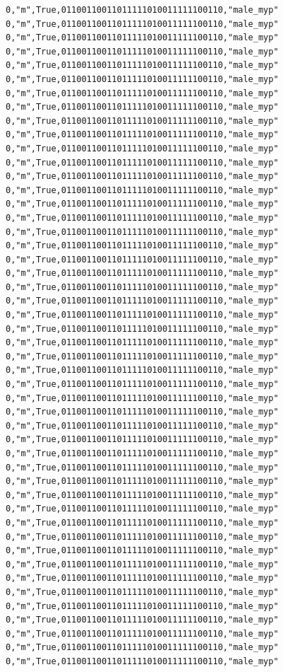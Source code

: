 \documentclass[authoryearcitations]{UoYCSproject}
\begin{document}
\begin{framed}
\begin{verbatim}
0,"m",True,01100110011011111010011111100110,"male_myp"
0,"m",True,01100110011011111010011111100110,"male_myp"
0,"m",True,01100110011011111010011111100110,"male_myp"
0,"m",True,01100110011011111010011111100110,"male_myp"
0,"m",True,01100110011011111010011111100110,"male_myp"
0,"m",True,01100110011011111010011111100110,"male_myp"
0,"m",True,01100110011011111010011111100110,"male_myp"
0,"m",True,01100110011011111010011111100110,"male_myp"
0,"m",True,01100110011011111010011111100110,"male_myp"
0,"m",True,01100110011011111010011111100110,"male_myp"
0,"m",True,01100110011011111010011111100110,"male_myp"
0,"m",True,01100110011011111010011111100110,"male_myp"
0,"m",True,01100110011011111010011111100110,"male_myp"
0,"m",True,01100110011011111010011111100110,"male_myp"
0,"m",True,01100110011011111010011111100110,"male_myp"
0,"m",True,01100110011011111010011111100110,"male_myp"
0,"m",True,01100110011011111010011111100110,"male_myp"
0,"m",True,01100110011011111010011111100110,"male_myp"
0,"m",True,01100110011011111010011111100110,"male_myp"
0,"m",True,01100110011011111010011111100110,"male_myp"
0,"m",True,01100110011011111010011111100110,"male_myp"
0,"m",True,01100110011011111010011111100110,"male_myp"
0,"m",True,01100110011011111010011111100110,"male_myp"
0,"m",True,01100110011011111010011111100110,"male_myp"
0,"m",True,01100110011011111010011111100110,"male_myp"
0,"m",True,01100110011011111010011111100110,"male_myp"
0,"m",True,01100110011011111010011111100110,"male_myp"
0,"m",True,01100110011011111010011111100110,"male_myp"
0,"m",True,01100110011011111010011111100110,"male_myp"
0,"m",True,01100110011011111010011111100110,"male_myp"
0,"m",True,01100110011011111010011111100110,"male_myp"
0,"m",True,01100110011011111010011111100110,"male_myp"
0,"m",True,01100110011011111010011111100110,"male_myp"
0,"m",True,01100110011011111010011111100110,"male_myp"
0,"m",True,01100110011011111010011111100110,"male_myp"
0,"m",True,01100110011011111010011111100110,"male_myp"
0,"m",True,01100110011011111010011111100110,"male_myp"
0,"m",True,01100110011011111010011111100110,"male_myp"
0,"m",True,01100110011011111010011111100110,"male_myp"
0,"m",True,01100110011011111010011111100110,"male_myp"
0,"m",True,01100110011011111010011111100110,"male_myp"
0,"m",True,01100110011011111010011111100110,"male_myp"
0,"m",True,01100110011011111010011111100110,"male_myp"
0,"m",True,01100110011011111010011111100110,"male_myp"
0,"m",True,01100110011011111010011111100110,"male_myp"
0,"m",True,01100110011011111010011111100110,"male_myp"
0,"m",True,01100110011011111010011111100110,"male_myp"
0,"m",True,01100110011011111010011111100110,"male_myp"

\end{verbatim}
\end{framed}
\end{document}
